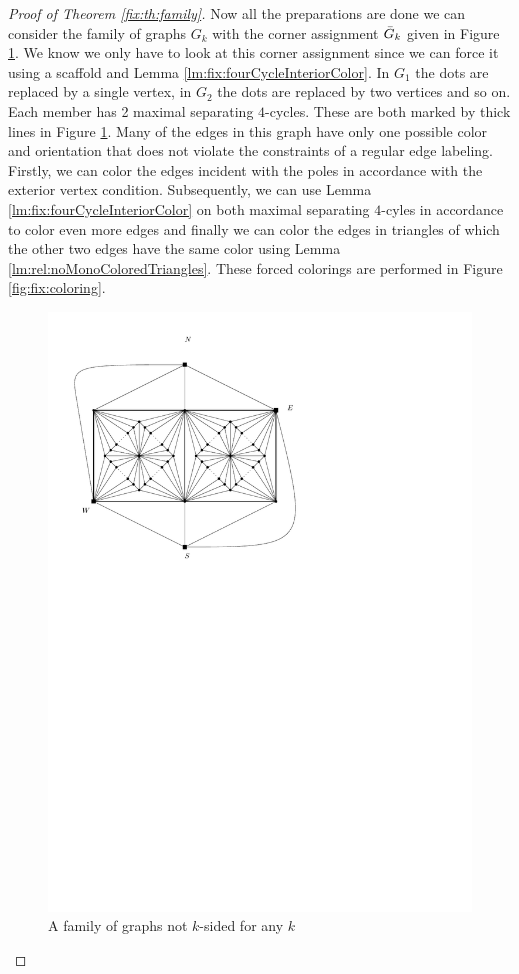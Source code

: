 \begin{proof}[Proof of Theorem \ref{fix:th:family}]
  Now all the preparations are done we can consider the family of graphs $G_k$ with the corner assignment $\bar{G}_k$ given in Figure \ref{fig:fix:manymany0}. We know we only have to look at this corner assignment since we can force it using a scaffold and Lemma \ref{lm:fix:fourCycleInteriorColor}. In $G_1$ the dots are replaced by a single vertex, in $G_2$ the dots are replaced by two vertices and so on. Each member has 2 maximal separating $4$-cycles. These are both marked by thick lines in Figure \ref{fig:fix:manymany0}.
  Many of the edges in this graph have only one possible color and orientation that does not violate the constraints of a regular edge labeling. Firstly, we can color the edges incident with the poles in accordance with the exterior vertex condition. Subsequently, we can use Lemma \ref{lm:fix:fourCycleInteriorColor} on both maximal separating $4$-cyles in accordance to color even more edges and finally we can color the edges in triangles of which the other two edges have  the same color using Lemma \ref{lm:rel:noMonoColoredTriangles}. These forced colorings are performed in Figure \ref{fig:fix:coloring}.

  \begin{figure}[t]
    \centering
    \includegraphics[scale=1]{fixExtension/img/manymanybase}
    \caption{A family of graphs not $k$-sided for any $k$}
    \label{fig:fix:manymany0}
  \end{figure}





\end{proof}
